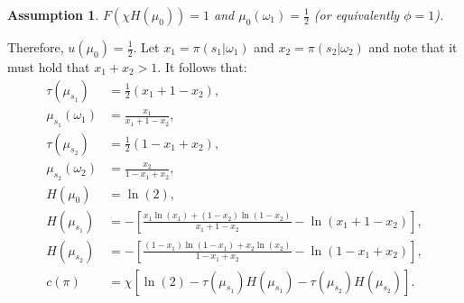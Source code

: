 \documentclass[12pt,a4paper]{article}
\newtheorem{assumption}{Assumption}
\begin{document}
\begin{assumption}
\label{Ass1}
    $F(\chi H(\mu_0))=1$ and $\mu_0(\omega_1)=\frac{1}{2}$ (or equivalently $\phi=1$).
\end{assumption}

Therefore, $u(\mu_0) = \frac{1}{2}$. Let $x_1=\pi(s_1|\omega_1)$ and $x_2=\pi(s_2|\omega_2)$ and note that it must hold that $x_1+x_2>1$. It follows that:
\begin{align}
    \label{taus1}
    \tau(\mu_{s_1}) & = \frac{1}{2}(x_1 + 1-x_2), \\
    \label{mus1}
    \mu_{s_1}(\omega_1) & = \frac{x_1}{x_1 + 1-x_2}, \\
    \label{taus2}
    \tau(\mu_{s_2}) & = \frac{1}{2}(1-x_1 + x_2), \\
    \label{mus2}
    \mu_{s_2}(\omega_2) & = \frac{x_2}{1-x_1 + x_2}, \\
     H(\mu_0) & = \ln(2), \\
     H(\mu_{s_1}) & = -\left[\frac{x_1\ln(x_1)+(1-x_2)\ln(1-x_2)}{x_1+1-x_2}-\ln(x_1+1-x_2)\right], \\
     H(\mu_{s_2}) & = -\left[\frac{(1-x_1)\ln(1-x_1)+x_2\ln(x_2)}{1-x_1+x_2}-\ln(1-x_1+x_2)\right], \\
     c(\pi) & = \chi\left[\ln(2)-\tau(\mu_{s_1})H(\mu_{s_1})-\tau(\mu_{s_2})H(\mu_{s_2})\right].
\end{align}
\end{document}

